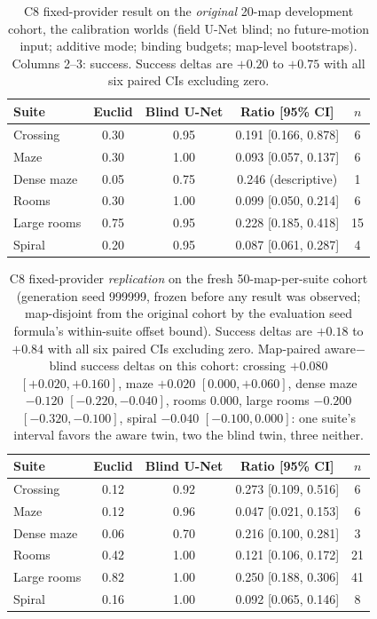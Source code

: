 \documentclass[letterpaper]{article} %
\newcommand{\stage}[1]{\textsc{#1}}
\begin{document}
\begin{table}[t]
\centering
\small
\setlength{\tabcolsep}{3pt}
\begin{tabular}{@{}lcccc@{}}
\toprule
Suite & Euclid & Blind U-Net & Ratio [95\% CI] & $n$ \\
\midrule
Crossing & 0.30 & 0.95 & 0.191 [0.166, 0.878] & 6 \\
Maze & 0.30 & 1.00 & 0.093 [0.057, 0.137] & 6 \\
Dense maze & 0.05 & 0.75 & 0.246 (descriptive) & 1 \\
Rooms & 0.30 & 1.00 & 0.099 [0.050, 0.214] & 6 \\
Large rooms & 0.75 & 0.95 & 0.228 [0.185, 0.418] & 15 \\
Spiral & 0.20 & 0.95 & 0.087 [0.061, 0.287] & 4 \\
\bottomrule
\end{tabular}
\caption{\stage{C8} fixed-provider result on the \emph{original} 20-map development cohort, the calibration worlds (field U-Net blind; no future-motion input; additive mode; binding budgets; map-level bootstraps). Columns 2--3: success. Success deltas are $+0.20$ to $+0.75$ with all six paired CIs excluding zero.}
\label{tab:c8fixed}
\end{table}

\begin{table}[t]
\centering
\small
\setlength{\tabcolsep}{3pt}
\begin{tabular}{@{}lcccc@{}}
\toprule
Suite & Euclid & Blind U-Net & Ratio [95\% CI] & $n$ \\
\midrule
Crossing & 0.12 & 0.92 & 0.273 [0.109, 0.516] & 6 \\
Maze & 0.12 & 0.96 & 0.047 [0.021, 0.153] & 6 \\
Dense maze & 0.06 & 0.70 & 0.216 [0.100, 0.281] & 3 \\
Rooms & 0.42 & 1.00 & 0.121 [0.106, 0.172] & 21 \\
Large rooms & 0.82 & 1.00 & 0.250 [0.188, 0.306] & 41 \\
Spiral & 0.16 & 1.00 & 0.092 [0.065, 0.146] & 8 \\
\bottomrule
\end{tabular}
\caption{\stage{C8} fixed-provider \emph{replication} on the fresh 50-map-per-suite cohort (generation seed 999999, frozen before any result was observed; map-disjoint from the original cohort by the evaluation seed formula's within-suite offset bound). Success deltas are $+0.18$ to $+0.84$ with all six paired CIs excluding zero. Map-paired aware$-$blind success deltas on this cohort: crossing $+0.080$ $[+0.020,+0.160]$, maze $+0.020$ $[0.000,+0.060]$, dense maze $-0.120$ $[-0.220,-0.040]$, rooms $0.000$, large rooms $-0.200$ $[-0.320,-0.100]$, spiral $-0.040$ $[-0.100,0.000]$: one suite's interval favors the aware twin, two the blind twin, three neither.}
\label{tab:c8fresh}
\end{table}
\end{document}
